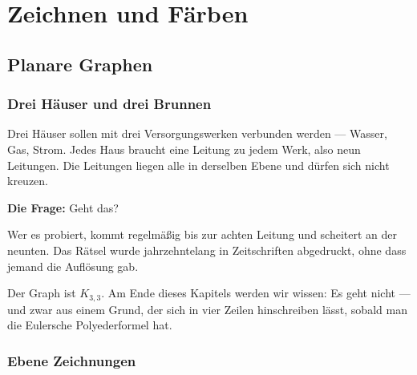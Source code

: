 \part{Zeichnen und Färben}

\chapter{Planare Graphen}

\section{Drei Häuser und drei Brunnen}

\begin{merksatz}
Drei Häuser sollen mit drei Versorgungswerken verbunden werden --- Wasser, Gas, Strom. Jedes Haus braucht eine Leitung zu jedem Werk, also neun Leitungen. Die Leitungen liegen alle in derselben Ebene und dürfen sich nicht kreuzen.

\begin{center}
\end{center}

\textbf{Die Frage:} Geht das?
\end{merksatz}

Wer es probiert, kommt regelmäßig bis zur achten Leitung und scheitert an der neunten. Das Rätsel wurde jahrzehntelang in Zeitschriften abgedruckt, ohne dass jemand die Auflösung gab.

Der Graph ist $K_{3,3}$. Am Ende dieses Kapitels werden wir wissen: Es geht nicht --- und zwar aus einem Grund, der sich in vier Zeilen hinschreiben lässt, sobald man die Eulersche Polyederformel hat.

\section{Ebene Zeichnungen}

